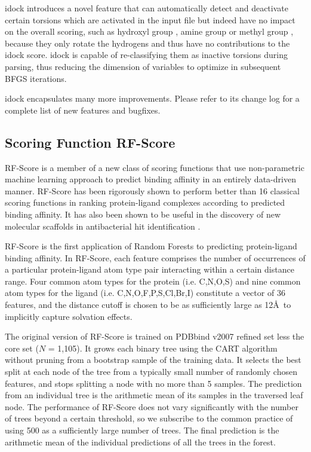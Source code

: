 \documentclass[10pt]{article}
\begin{document}
idock introduces a novel feature that can automatically detect and deactivate certain torsions which are activated in the input file but indeed have no impact on the overall scoring, such as hydroxyl group , amine group  or methyl group , because they only rotate the hydrogens and thus have no contributions to the idock score. idock is capable of re-classifying them as inactive torsions during parsing, thus reducing the dimension of variables to optimize in subsequent BFGS iterations.

idock encapsulates many more improvements. Please refer to its change log for a complete list of new features and bugfixes.

\subsection*{Scoring Function RF-Score}
RF-Score \cite{564} is a member of a new class of scoring functions that use non-parametric machine learning approach to predict binding affinity in an entirely data-driven manner. RF-Score has been rigorously shown \cite{564,908} to perform better than 16 classical scoring functions in ranking protein-ligand complexes according to predicted binding affinity. It has also been shown to be useful in the discovery of new molecular scaffolds in antibacterial hit identification \cite{1281}.

RF-Score is the first application of Random Forests \cite{1309} to predicting protein-ligand binding affinity. In RF-Score, each feature comprises the number of occurrences of a particular protein-ligand atom type pair interacting within a certain distance range. Four common atom types for the protein (i.e. C,N,O,S) and nine common atom types for the ligand (i.e. C,N,O,F,P,S,Cl,Br,I) constitute a vector of 36 features, and the distance cutoff is chosen to be as sufficiently large as 12\AA\ to implicitly capture solvation effects.

The original version of RF-Score \cite{564} is trained on PDBbind v2007 refined set less the core set ($N$ = 1,105). It grows each binary tree using the CART algorithm \cite{1310} without pruning from a bootstrap sample of the training data. It selects the best split at each node of the tree from a typically small number of randomly chosen features, and stops splitting a node with no more than 5 samples. The prediction from an individual tree is the arithmetic mean of its samples in the traversed leaf node. The performance of RF-Score does not vary significantly with the number of trees beyond a certain threshold, so we subscribe to the common practice of using 500 as a sufficiently large number of trees. The final prediction is the arithmetic mean of the individual predictions of all the trees in the forest.
\end{document}
